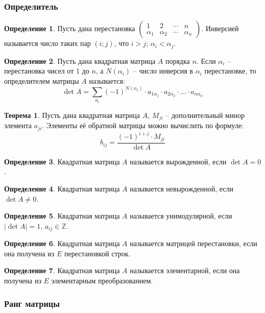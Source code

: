 \documentclass[12pt]{article}
\theoremstyle{definition}
\newtheorem{theorem}{Теорема}[section]
\newtheorem{definition}{Определение}
\newcommand{\Z}{\mathbb{Z}}
\begin{document}
\subsubsection{Определитель}

\begin{definition}
    Пусть дана перестановка $\begin{pmatrix}
        1 & 2 & \cdots & n\\
        \alpha_1 & \alpha_2 & \cdots & \alpha_n
    \end{pmatrix}$. Инверсией называется число таких пар $(i;j)$, что $i>j;\,\alpha_i<\alpha_j$.
\end{definition}
\begin{definition}
    Пусть дана квадратная матрица $A$ порядка $n$. Если $\alpha_i$ – перестановка чисел от 1 до $n$, а $N(\alpha_i)$ – число инверсия в $\alpha_i$ перестановке, то определителем матрицы $A$ называется:
    $$\det A=\sum_{a_i}(-1)^{N(\alpha_i)}\cdot a_{1\alpha_1}\cdot a_{2\alpha_2}\cdot\ldots\cdot a_{n\alpha_n}$$
\end{definition}
\begin{theorem}
    Пусть дана квадратная матрица $A$, $M_{ji}$ – дополнительный минор элемента $a_{ji}$. Элементы её обратной матрицы можно вычислить по формуле:
    $$b_{ij}=\frac{(-1)^{i+j}\cdot M_{ji}}{\det A}$$
\end{theorem}
\begin{definition}
    Квадратная матрица $A$ называется вырожденной, если $\det A=0$.
\end{definition}
\begin{definition}
    Квадратная матрица $A$ называется невырожденной, если $\det A\neq0$.
\end{definition}
\begin{definition}
    Квадратная матрица $A$ называется унимодулярной, если $|\det A|=1,\,a_{ij}\in\Z$.
\end{definition}
\begin{definition}
    Квадратная матрица $A$ называется матрицей перестановки, если она получена из $E$ перестановкой строк.
\end{definition}
\begin{definition}
    Квадратная матрица $A$ называется элементарной, если она получена из $E$ элементарным преобразованием.
\end{definition}

\subsubsection{Ранг матрицы}
\end{document}
